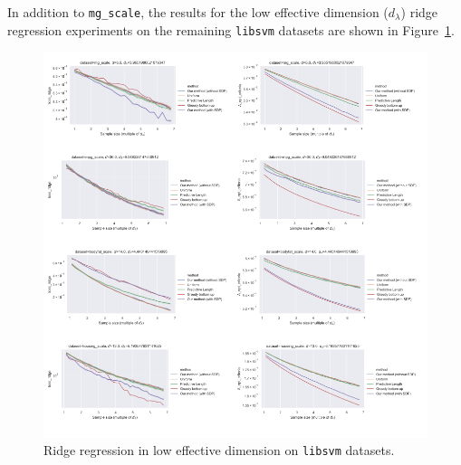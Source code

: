 

In addition to \texttt{mg\_scale}, the results for the low effective dimension
($d_\lambda$) ridge regression experiments on the remaining \texttt{libsvm}
datasets are shown in Figure~\ref{f:small_deff_ridge_and_a_opt}.

\begin{figure}[htpb]
    \centering
    \includegraphics[width=\textwidth]{bayesian_figures/small_deff_ridge_and_a_opt.pdf}
    \caption{Ridge regression in low effective dimension on \texttt{libsvm} datasets.}
    \label{f:small_deff_ridge_and_a_opt}
\end{figure}
